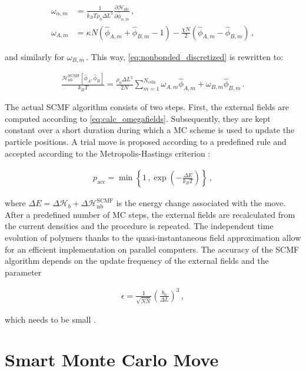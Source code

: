 \documentclass[bachelor,       %
               oneside,        %
               BCOR10mm,       %
               ngerman, english %
               ]{GAUBM}
\begin{document}
\begin{align}
    \omega_{\alpha,m}&=\frac{1}{k_BT\rho_0\Delta L^3}\frac{\partial \mathcal H_{\text{nb}}}{\partial \hat\phi_{\alpha,m}}\,,\nonumber \\
    \omega_{A,m}&=\kappa N\left(\hat\phi_{A,m}+\hat\phi_{B,m}-1\right)-\frac{\chi N}{2}\left(\hat\phi_{A,m}-\hat\phi_{B,m}\right)\,,
    \label{eq:calc_omegafields}
\end{align}

and similarly for $\omega_{B,m}\,.$ This way, \autoref{eq:nonbonded_discretized} is rewritten to:

\begin{align}
    \frac{\mathcal H_\text{nb}^{\text{SCMF}}[\hat\phi_A,\hat\phi_B]}{k_BT}=\frac{\rho_0\Delta L^3}{2N}\sum_{m=1}^{N_\text{cells}}\omega_{A,m}\hat\phi_{A,m}+\omega_{B,m}\hat\phi_{B,m}\,.
\end{align}

The actual \ac{SCMF} algorithm consists of two steps. First, the external fields are computed according to \autoref{eq:calc_omegafields}. Subsequently, they are kept constant over a short duration during which a \ac{MC} scheme is used to update the particle positions. A trial move is proposed according to a predefined rule and accepted according to the Metropolis-Hastings criterion \cite{metropolis}:

\begin{align}
    p_{\text{acc}}=\min\left\{1\,,\exp\left(-\frac{\Delta E}{k_BT}\right)\right\}\,,
    \label{eq:metropolis_mc}
\end{align}

where $\Delta E=\Delta\mathcal H_b+\Delta\mathcal H_{\text{nb}}^{\text{SCMF}}$ is the energy change associated with the move. After a predefined number of \ac{MC} steps, the external fields are recalculated from the current densities and the procedure is repeated. The independent time evolution of polymers thanks to the quasi-instantaneous field approximation allow for an efficient implementation on parallel computers. The accuracy of the \ac{SCMF} algorithm depends on the update frequency of the external fields and the parameter

\begin{align}
    \epsilon=\frac{1}{\sqrt{N\bar N}}\left(\frac{b_0}{\Delta L}\right)^3\,,
\end{align}

which needs to be small \cite{Schneider_soma}.

\section{Smart Monte Carlo Move}
\end{document}
